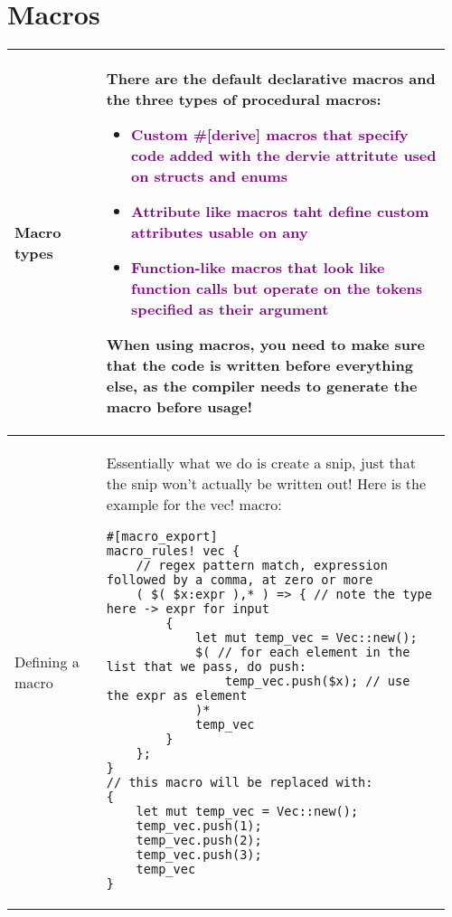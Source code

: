 \documentclass[main.tex,fontsize=8pt,paper=a4,paper=portrait,DIV=calc,]{scrartcl}
\begin{document}
\begin{table}[ht!]
\section{Macros}
\begin{tabular}{|m{0.2\linewidth}|m{0.755\linewidth}|}
\hline
Macro types & 
There are the default \textbf{declarative macros} and the \textbf{three types of procedural macros:}\newline
\begin{itemize}
  \item \textcolor{purple}{Custom \#[derive] macros that specify code added with the dervie attritute used on structs and enums}
  \item \textcolor{purple}{Attribute like macros taht define custom attributes usable on any} 
\item \textcolor{purple}{Function-like macros that look like function calls but operate on the tokens specified as their argument}
\end{itemize} 
\textcolor{OliveGreen}{When using macros, you need to make sure that the code is written before everything else, as the compiler needs to generate the macro before usage!}\\
\hline
Defining a macro & 
Essentially what we do is create a snip, just that the snip won't actually be written out!\newline
Here is the example for the vec! macro:\newline
\begin{lstlisting}
#[macro_export]
macro_rules! vec {
    // regex pattern match, expression followed by a comma, at zero or more
    ( $( $x:expr ),* ) => { // note the type here -> expr for input
        {
            let mut temp_vec = Vec::new();
            $( // for each element in the list that we pass, do push:
                temp_vec.push($x); // use the expr as element
            )*
            temp_vec
        }
    };
}
// this macro will be replaced with: 
{
    let mut temp_vec = Vec::new();
    temp_vec.push(1);
    temp_vec.push(2);
    temp_vec.push(3);
    temp_vec
}
\end{lstlisting}\\
\hline
\end{tabular}
\end{table}
\pagebreak
\end{document}

